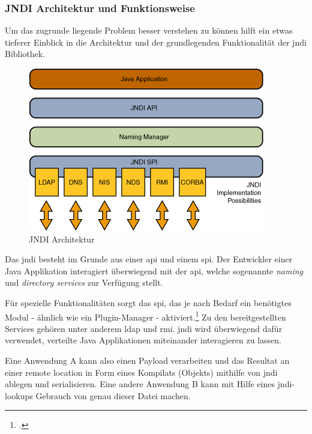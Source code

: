 \subsubsection{JNDI Architektur und Funktionsweise}

Um das zugrunde liegende Problem besser verstehen zu können hilft ein etwas tieferer Einblick in die Architektur
und der grundlegenden Funktionalität der \gls{jndi} Bibliothek.
\begin{figure}[!htb]\label{fig:jndiarch} %
    \begin{center}
        \includegraphics[scale=0.75]{images/jndiarch}
    \end{center}
    \caption{JNDI Architektur}
\end{figure}
\bigskip

Das \gls{jndi} besteht im Grunde aus einer \gls{api} und einem \gls{spi}.
Der Entwickler einer Java Applikation interagiert überwiegend mit der \gls{api}, welche sogenannte \textit{naming} und \textit{directory services} zur Verfügung stellt.

Für spezielle Funktionalitäten sorgt das \gls{spi}, das je nach Bedarf ein benötigtes Modul - ähnlich wie ein Plugin-Manager - aktiviert.\footcite{JNDIArchitektur}
Zu den bereitgestellten Services gehören unter anderem \gls{ldap} und \gls{rmi}.
\gls{jndi} wird überwiegend dafür verwendet, verteilte Java Applikationen miteinander interagieren zu lassen.

Eine Anwendung A kann also einen Payload verarbeiten und das Resultat an einer remote location in Form eines Kompilats (Objekts) mithilfe von \gls{jndi} ablegen und serialisieren.
Eine andere Anwendung B kann mit Hilfe eines \gls{jndi}-lookups Gebrauch von genau dieser Datei machen.

